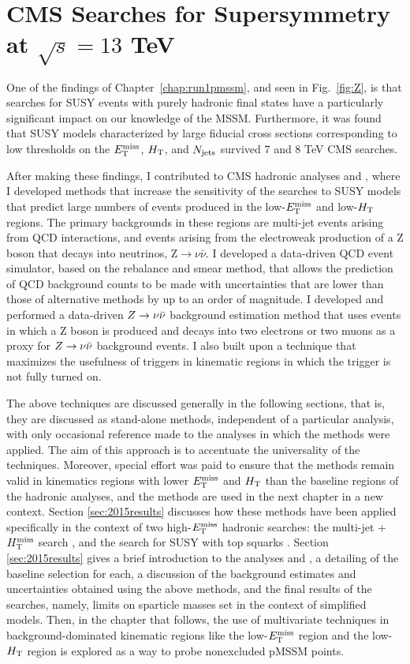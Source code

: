 \chapter{CMS Searches for Supersymmetry at $\sqrt{s}=13$ TeV}
\label{chap:susysearches}
One of the findings of Chapter~\ref{chap:run1pmssm}, and seen in Fig.~\ref{fig:Z}, is that searches for SUSY events with purely hadronic final states have a particularly significant impact on our knowledge of the MSSM. Furthermore, it was found that SUSY models characterized by large fiducial cross sections corresponding to low thresholds on the $E_{\text{T}}^{\rm miss}$, $H_{\rm T}$, and $N_{\rm jets}$ survived 7 and 8 TeV CMS searches. 

After making these findings, I contributed to CMS hadronic analyses \cite{Khachatryan:2016kdk} and \cite{CMS:2016nhb}, where I developed methods that increase the sensitivity of the searches to SUSY models that predict large numbers of events produced in the low-$E_{\text{T}}^{\rm miss}$ and low-$H_{\rm T}$ regions. The primary backgrounds in these regions are multi-jet events arising from QCD interactions, and events arising from the electroweak production of a Z boson that decays into neutrinos, Z$\rightarrow\nu\bar{\nu}$. I developed a data-driven QCD event simulator, based on the rebalance and smear method, that allows the prediction of QCD background counts to be made with uncertainties that are lower than those of alternative methods by up to an order of magnitude. I developed and performed a data-driven $Z\rightarrow \nu\bar{\nu}$ background estimation method that uses events in which a Z boson is produced and decays into two electrons or two muons as a proxy for $Z\rightarrow \nu\bar{\nu}$ background events. I also built upon a technique that maximizes the usefulness of triggers in kinematic regions in which the trigger is not fully turned on. 

The above techniques are discussed generally in the following sections, that is, they are discussed as stand-alone methods, independent of a particular analysis, with only occasional reference made to the analyses in which the methods were applied. The aim of this approach is to accentuate the universality of the techniques. Moreover, special effort was paid to ensure that the methods remain valid in kinematics regions with lower $E_{\text{T}}^{\rm miss}$ and $H_{\rm T}$ than the baseline regions of the hadronic analyses, and the methods are used in the next chapter in a new context. Section \ref{sec:2015results} discusses how these methods have been applied specifically in the context of two high-$E_{\text{T}}^{\rm miss}$ hadronic searches: the multi-jet + $H_{\text{T}}^{\rm miss}$ search \cite{Khachatryan:2016kdk}, and the search for SUSY with top squarks \cite{CMS:2016nhb}. Section \ref{sec:2015results} gives a brief introduction to the analyses \cite{Khachatryan:2016kdk} and \cite{CMS:2016nhb}, a detailing of the baseline selection for each, a discussion of the background estimates and uncertainties obtained using the above methods, and the final results of the searches, namely, limits on sparticle masses set in the context of simplified models.  Then, in the chapter that follows, the use of multivariate techniques in background-dominated kinematic regions like the low-$E_{\text{T}}^{\rm miss}$ region and the low-$H_{\rm T}$ region is explored as a way to probe nonexcluded pMSSM points. 


